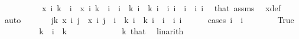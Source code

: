 \begin{isabellebody}
\ \ \isamarkupfalse%
\ {\isacharminus}{\kern0pt}\isanewline
\ \ \ \ \isamarkupfalse%
\ {\isacharasterisk}{\kern0pt}{\isacharcolon}{\kern0pt}{\isachardoublequoteopen}x\ i{}\ {\isacharparenleft}{\kern0pt}k\ {\isacharminus}{\kern0pt}\ i{}{\isacharparenright}{\kern0pt}\ {\isasymnoteq}\ x\ i{}\ {\isacharparenleft}{\kern0pt}k\ {\isacharminus}{\kern0pt}\ i{}{\isacharparenright}{\kern0pt}{\isachardoublequoteclose}\ \ {\isachardoublequoteopen}i{}\ {\isasymle}\ k{\isachardoublequoteclose}\ {\isachardoublequoteopen}i{}\ {\isasymle}\ k{\isachardoublequoteclose}\ {\isachardoublequoteopen}i{}\ {\isasymnoteq}\ i{}{\isachardoublequoteclose}\ {\isachardoublequoteopen}i{}\ {\isacharless}{\kern0pt}\ i{}{\isachardoublequoteclose}\ \ i{}\ i{}\ \isamarkupfalse%
\ that\ assms{\isacharparenleft}{\kern0pt}{}{\isacharparenright}{\kern0pt}\ \isamarkupfalse%
\ x{\isacharunderscore}{\kern0pt}def\ \isamarkupfalse%
\ auto\ \isanewline
\ \ \ \ \isamarkupfalse%
\ {\isachardoublequoteopen}{\isasymexists}j{\isacharless}{\kern0pt}k{\isachardot}{\kern0pt}\ x\ i{}\ j\ {\isasymnoteq}\ x\ i{}\ j{\isachardoublequoteclose}\ \ {\isachardoublequoteopen}i{}\ {\isasymle}\ k{\isachardoublequoteclose}\ {\isachardoublequoteopen}i{}\ {\isasymle}\ k{\isachardoublequoteclose}\ {\isachardoublequoteopen}i{}\ {\isasymnoteq}\ i{}{\isachardoublequoteclose}\ \ i{}\ i{}\isanewline
\ \ \ \ \isamarkupfalse%
\ {\isacharparenleft}{\kern0pt}cases\ {\isachardoublequoteopen}i{}\ {\isasymle}\ i{}{\isachardoublequoteclose}{\isacharparenright}{\kern0pt}\isanewline
\ \ \ \ \ \ \isamarkupfalse%
\ True\isanewline
\ \ \ \ \ \ \isamarkupfalse%
\ \isamarkupfalse%
\ {\isachardoublequoteopen}k\ {\isacharminus}{\kern0pt}\ i{}\ {\isacharless}{\kern0pt}\ k{\isachardoublequoteclose}\ \isanewline
\ \ \ \ \ \ \ \ \isamarkupfalse%
\ {\isacartoucheopen}{}\ {\isacharless}{\kern0pt}\ k{\isacartoucheclose}\ that{\isacharparenleft}{\kern0pt}{}{\isacharparenright}{\kern0pt}\ \isamarkupfalse%
\ linarith\isanewline
\ \ \ \ \ \ \isamarkupfalse%
\ \isamarkupfalse%

\end{isabellebody}
